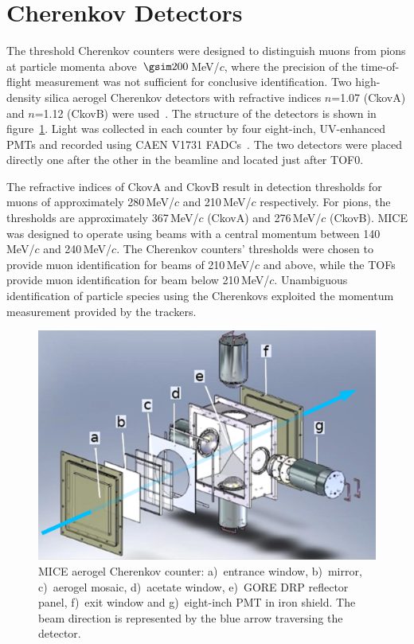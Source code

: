 \graphicspath{{03-Ckov/Figures/}}

\section{Cherenkov Detectors}
\label{Sect:Ckov}

The threshold Cherenkov counters were designed to distinguish
muons from pions at particle momenta
\linebreak[4] 
above~$\gsim 200$\,MeV/$c$, where
the precision of the time-of-flight measurement was not sufficient for
conclusive identification.
Two high-density silica aerogel Cherenkov detectors with refractive
indices $n$=1.07 (CkovA) and $n$=1.12 (CkovB) were used~\cite{Cremaldi:2009zj}.
The structure of the detectors is shown in figure~\ref{fig:ckov1}.
Light was collected in each counter by four eight-inch, UV-enhanced
PMTs and recorded using CAEN V1731 FADCs~\cite{NOTE473}.
The two detectors were placed directly one after the other in the
beamline and located just after TOF0.

The refractive indices of CkovA and CkovB result in detection
thresholds for muons of approximately 280\,MeV/$c$ and 210\,MeV/$c$ respectively.
For pions, the thresholds are approximately 367\,MeV/$c$ (CkovA) and
276\,MeV/$c$ (CkovB).
MICE was designed to operate using beams with a central momentum
between 140\,MeV/$c$ and 240\,MeV/$c$.
The Cherenkov counters' thresholds were chosen to provide muon identification for beams of 210\,MeV/$c$ and above, while the TOFs provide muon identification for beam below 210\,MeV/$c$.
Unambiguous identification of particle species using the Cherenkovs
exploited the momentum measurement provided by the trackers. \\
\begin{figure}[htb]
  \begin{center}
    \includegraphics[width=0.65\columnwidth]{./03-Ckov/Figures/Ckov_fix-with_beam.png}
  \end{center}
  \caption{
    MICE aerogel Cherenkov counter: a)~entrance window,
    b)~mirror, c)~aerogel mosaic, d)~acetate window, e)~GORE DRP reflector
    panel, f)~exit window and g)~eight-inch PMT in iron shield.
    The beam direction is represented by the blue arrow traversing the detector.
  } 
  \label{fig:ckov1}
\end{figure}

